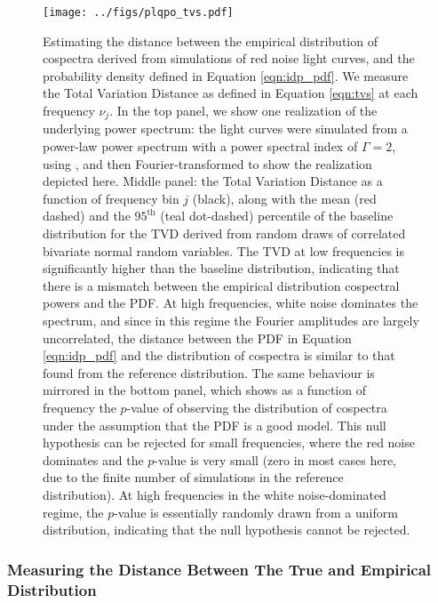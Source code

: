 \documentclass[fleqn,usenatbib]{mnras}
\begin{document}
\begin{figure}
\begin{center}
\texttt{[image: ../figs/plqpo\_tvs.pdf]}
\caption{Estimating the distance between the empirical distribution of cospectra derived from simulations of red noise light curves, and the probability density defined in Equation \ref{eqn:idp_pdf}. We measure the Total Variation Distance as defined in Equation \ref{eqn:tvs} at each frequency $\nu_j$. In the top panel, we show one realization of the underlying power spectrum: the light curves were simulated from a power-law power spectrum with a power spectral index of $\Gamma = 2$, using \citet{timmer1995}, and then Fourier-transformed to show the realization depicted here. Middle panel: the Total Variation Distance as a function of frequency bin $j$ (black), along with the mean (red dashed) and the $95^{\mathrm{th}}$ (teal dot-dashed) percentile of the baseline distribution for the TVD derived from random draws of correlated bivariate normal random variables. The TVD at low frequencies is significantly higher than the baseline distribution, indicating that there is a mismatch between the empirical distribution cospectral powers and the PDF. At high frequencies, white noise dominates the spectrum, and since in this regime the Fourier amplitudes are largely uncorrelated, the distance between the PDF in Equation \ref{eqn:idp_pdf} and the distribution of cospectra is similar to that found from the reference distribution. The same behaviour is mirrored in the bottom panel, which shows as a function of frequency the $p$-value of observing the distribution of cospectra under the assumption that the PDF is a good model. This null hypothesis can be rejected for small frequencies, where the red noise dominates and the $p$-value is very small (zero in most cases here, due to the finite number of simulations in the reference distribution). At high frequencies in the white noise-dominated regime, the $p$-value is essentially randomly drawn from a uniform distribution, indicating that the null hypothesis cannot be rejected.}
\label{fig:plqpo_tvs}
\end{center}
\end{figure}

\subsubsection{Measuring the Distance Between The True and Empirical Distribution}
\end{document}
